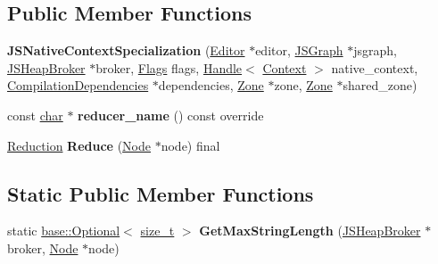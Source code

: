 \subsection*{Public Member Functions}
\begin{DoxyCompactItemize}
\item 
\mbox{\label{classv8_1_1internal_1_1compiler_1_1JSNativeContextSpecialization_a2c8177b0fe4f45003a1d1db18c15c95a}} 
{\bfseries J\+S\+Native\+Context\+Specialization} (\mbox{\hyperlink{classv8_1_1internal_1_1compiler_1_1AdvancedReducer_1_1Editor}{Editor}} $\ast$editor, \mbox{\hyperlink{classv8_1_1internal_1_1compiler_1_1JSGraph}{J\+S\+Graph}} $\ast$jsgraph, \mbox{\hyperlink{classv8_1_1internal_1_1compiler_1_1JSHeapBroker}{J\+S\+Heap\+Broker}} $\ast$broker, \mbox{\hyperlink{classv8_1_1base_1_1Flags}{Flags}} flags, \mbox{\hyperlink{classv8_1_1internal_1_1Handle}{Handle}}$<$ \mbox{\hyperlink{classv8_1_1internal_1_1Context}{Context}} $>$ native\+\_\+context, \mbox{\hyperlink{classv8_1_1internal_1_1compiler_1_1CompilationDependencies}{Compilation\+Dependencies}} $\ast$dependencies, \mbox{\hyperlink{classv8_1_1internal_1_1Zone}{Zone}} $\ast$zone, \mbox{\hyperlink{classv8_1_1internal_1_1Zone}{Zone}} $\ast$shared\+\_\+zone)
\item 
\mbox{\label{classv8_1_1internal_1_1compiler_1_1JSNativeContextSpecialization_a1727d3df94c0bbacf9ca75d81dfccff3}} 
const \mbox{\hyperlink{classchar}{char}} $\ast$ {\bfseries reducer\+\_\+name} () const override
\item 
\mbox{\label{classv8_1_1internal_1_1compiler_1_1JSNativeContextSpecialization_ae691af2aa397791c9bbb927e6fd705dd}} 
\mbox{\hyperlink{classv8_1_1internal_1_1compiler_1_1Reduction}{Reduction}} {\bfseries Reduce} (\mbox{\hyperlink{classv8_1_1internal_1_1compiler_1_1Node}{Node}} $\ast$node) final
\end{DoxyCompactItemize}
\subsection*{Static Public Member Functions}
\begin{DoxyCompactItemize}
\item 
\mbox{\label{classv8_1_1internal_1_1compiler_1_1JSNativeContextSpecialization_a7fcdb732ee7bba63d4666bc8106bb9ad}} 
static \mbox{\hyperlink{classv8_1_1base_1_1Optional}{base\+::\+Optional}}$<$ \mbox{\hyperlink{classsize__t}{size\+\_\+t}} $>$ {\bfseries Get\+Max\+String\+Length} (\mbox{\hyperlink{classv8_1_1internal_1_1compiler_1_1JSHeapBroker}{J\+S\+Heap\+Broker}} $\ast$broker, \mbox{\hyperlink{classv8_1_1internal_1_1compiler_1_1Node}{Node}} $\ast$node)
\end{DoxyCompactItemize}
